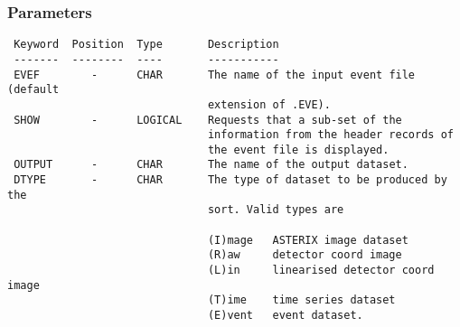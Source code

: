 \documentclass{book}
\renewcommand{\_}{{\tt\char'137}}     %
\begin{document}
\subsubsection{Parameters}
\begin{verbatim}
 Keyword  Position  Type       Description
 -------  --------  ----       -----------
 EVEF        -      CHAR       The name of the input event file (default
                               extension of .EVE).
 SHOW        -      LOGICAL    Requests that a sub-set of the
                               information from the header records of
                               the event file is displayed.
 OUTPUT      -      CHAR       The name of the output dataset.
 DTYPE       -      CHAR       The type of dataset to be produced by the
                               sort. Valid types are
 
                               (I)mage   ASTERIX image dataset
                               (R)aw     detector coord image
                               (L)in     linearised detector coord image
                               (T)ime    time series dataset
                               (E)vent   event dataset.
 

\end{verbatim}
\end{document}
